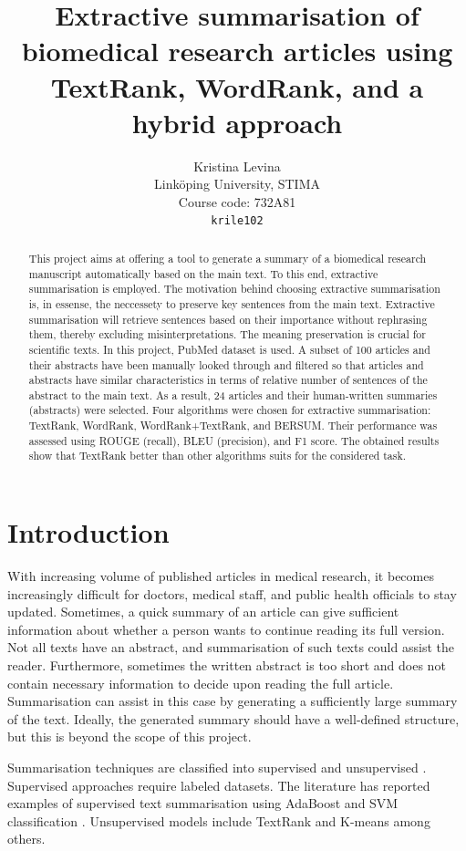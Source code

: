 \documentclass[11pt]{article}
\title{Extractive summarisation of biomedical research articles using TextRank, WordRank, and a hybrid approach}
\author{Kristina Levina \\
  Linköping University, STIMA \\
  Course code: 732A81 \\
 \texttt{krile102} \\}
\begin{document}
\maketitle
\begin{abstract}
This project aims at offering a tool to generate a summary of a biomedical research manuscript automatically based on the main text. To this end, extractive summarisation is employed. The motivation behind choosing extractive summarisation is, in essense, the neccessety to preserve key sentences from the main text. Extractive summarisation will retrieve sentences based on their importance without rephrasing them, thereby excluding misinterpretations. The meaning preservation is crucial for scientific texts. In this project, PubMed dataset is used. A subset of 100 articles and their abstracts have been manually looked through and filtered so that articles and abstracts have similar characteristics in terms of relative number of sentences of the abstract to the main text. As a result, 24 articles and their human-written summaries (abstracts) were selected. Four algorithms were chosen for extractive summarisation: TextRank, WordRank, WordRank+TextRank, and BERSUM. Their performance was assessed using ROUGE (recall), BLEU (precision), and F1 score. The obtained results show that TextRank better than other algorithms suits for the considered task. 

\end{abstract}

\section{Introduction}

With increasing volume of published articles in medical research, it becomes increasingly difficult for doctors, medical staff, and public health officials to stay updated. Sometimes, a quick summary of an article can give sufficient information about whether a person wants to continue reading its full version. Not all texts have an abstract, and summarisation of such texts could assist the reader. Furthermore, sometimes the written abstract is too short and does not contain necessary information to decide upon reading the full article. Summarisation can assist in this case by generating a sufficiently large summary of the text. Ideally, the generated summary should have a well-defined structure, but this is beyond the scope of this project.

Summarisation techniques are classified into supervised and unsupervised  \citep{widyassari2019literature}. Supervised approaches require labeled datasets. The literature has reported examples of supervised text summarisation using AdaBoost and SVM classification \citep{widyassari2019literature}. Unsupervised models include TextRank \citep{mihalcea2004textrank} and K-means \citep{garcia2008text} among others.
\end{document}
